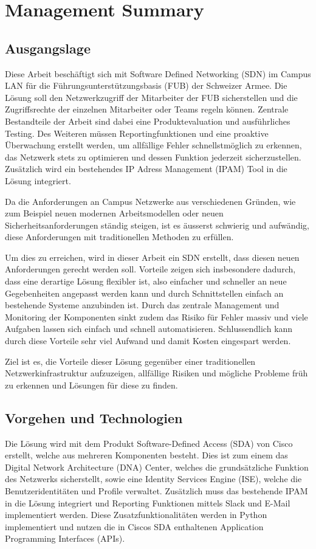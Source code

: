 \section{Management Summary}

\subsection{Ausgangslage}
Diese Arbeit beschäftigt sich mit Software Defined Networking (SDN) im Campus LAN für die Führungsunterstützungsbasis (FUB) der Schweizer Armee. Die Lösung soll den Netzwerkzugriff der Mitarbeiter der FUB sicherstellen und die Zugriffsrechte der einzelnen Mitarbeiter oder Teams regeln können. Zentrale Bestandteile der Arbeit sind dabei eine Produktevaluation und ausführliches Testing. 
Des Weiteren müssen Reportingfunktionen und eine proaktive Überwachung erstellt werden, um allfällige Fehler schnellstmöglich zu erkennen, das Netzwerk stets zu optimieren und dessen Funktion jederzeit sicherzustellen.
Zusätzlich wird ein bestehendes IP Adress Management (IPAM) Tool in die Lösung integriert.

Da die Anforderungen an Campus Netzwerke aus verschiedenen Gründen, wie zum Beispiel neuen modernen Arbeitsmodellen oder neuen Sicherheitsanforderungen ständig steigen, ist es äusserst schwierig und aufwändig, diese Anforderungen mit traditionellen Methoden zu erfüllen. 

Um dies zu erreichen, wird in dieser Arbeit ein SDN erstellt, dass diesen neuen Anforderungen gerecht werden soll. Vorteile zeigen sich insbesondere dadurch, dass eine derartige Lösung flexibler ist, also einfacher und schneller an neue Gegebenheiten angepasst werden kann und durch Schnittstellen einfach an bestehende Systeme anzubinden ist. Durch das zentrale Management und Monitoring der Komponenten sinkt zudem das Risiko für Fehler massiv und viele Aufgaben lassen sich einfach und schnell automatisieren.
Schlussendlich kann durch diese Vorteile sehr viel Aufwand und damit Kosten eingespart werden.

Ziel ist es, die Vorteile dieser Lösung gegenüber einer traditionellen Netzwerkinfrastruktur aufzuzeigen, allfällige Risiken und mögliche Probleme früh zu erkennen und Lösungen für diese zu finden. 
\subsection{Vorgehen und Technologien}
Die Lösung wird mit dem Produkt Software-Defined Access (SDA) von Cisco erstellt, welche aus mehreren Komponenten besteht. Dies ist zum einem das Digital Network Architecture (DNA) Center, welches die grundsätzliche Funktion des Netzwerks sicherstellt, sowie eine Identity Services Engine (ISE), welche die Benutzeridentitäten und Profile verwaltet.
Zusätzlich muss das bestehende IPAM in die Lösung integriert und Reporting Funktionen mittels Slack und E-Mail implementiert werden. Diese Zusatzfunktionalitäten werden in Python implementiert und nutzen die in Ciscos SDA enthaltenen Application Programming Interfaces (APIs).
